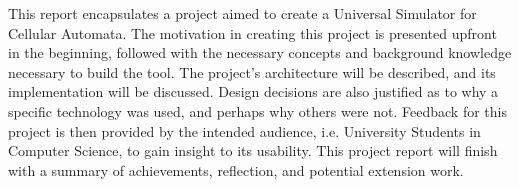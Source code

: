 This report encapsulates a project aimed to create a Universal Simulator for Cellular Automata. The motivation in creating this project is presented upfront in the beginning, followed with the necessary concepts and background knowledge necessary to build the tool. The project's architecture will be described, and its implementation will be discussed. Design decisions are also justified as to why a specific technology was used, and perhaps why others were not. Feedback for this project is then provided by the intended audience, i.e. University Students in Computer Science, to gain insight to its usability. This project report will finish with a summary of achievements, reflection, and potential extension work. 